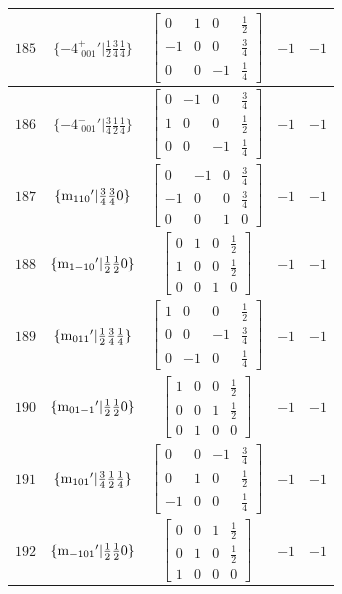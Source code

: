 \documentclass[fleqn,8pt]{jsarticle}
\begin{document}
\begin{longtable}{ccccc}
$ 185 $ & $ \{-4^{+}_{\,\,001}{}'|\frac{1}{2} \frac{3}{4} \frac{1}{4}\} $ & $ \begin{bmatrix} 0 & 1 & 0 & \frac{1}{2} \\ -1 & 0 & 0 & \frac{3}{4} \\ 0 & 0 & -1 & \frac{1}{4} \end{bmatrix} $ & $ -1 $ & $ -1 $ \\ \hline
$ 186 $ & $ \{-4^{-}_{\,\,001}{}'|\frac{3}{4} \frac{1}{2} \frac{1}{4}\} $ & $ \begin{bmatrix} 0 & -1 & 0 & \frac{3}{4} \\ 1 & 0 & 0 & \frac{1}{2} \\ 0 & 0 & -1 & \frac{1}{4} \end{bmatrix} $ & $ -1 $ & $ -1 $ \\ \hline
$ 187 $ & $ \{{\rm m}_{110}{}'|\frac{3}{4} \frac{3}{4} 0\} $ & $ \begin{bmatrix} 0 & -1 & 0 & \frac{3}{4} \\ -1 & 0 & 0 & \frac{3}{4} \\ 0 & 0 & 1 & 0 \end{bmatrix} $ & $ -1 $ & $ -1 $ \\ \hline
$ 188 $ & $ \{{\rm m}_{1-10}{}'|\frac{1}{2} \frac{1}{2} 0\} $ & $ \begin{bmatrix} 0 & 1 & 0 & \frac{1}{2} \\ 1 & 0 & 0 & \frac{1}{2} \\ 0 & 0 & 1 & 0 \end{bmatrix} $ & $ -1 $ & $ -1 $ \\ \hline
$ 189 $ & $ \{{\rm m}_{011}{}'|\frac{1}{2} \frac{3}{4} \frac{1}{4}\} $ & $ \begin{bmatrix} 1 & 0 & 0 & \frac{1}{2} \\ 0 & 0 & -1 & \frac{3}{4} \\ 0 & -1 & 0 & \frac{1}{4} \end{bmatrix} $ & $ -1 $ & $ -1 $ \\ \hline
$ 190 $ & $ \{{\rm m}_{01-1}{}'|\frac{1}{2} \frac{1}{2} 0\} $ & $ \begin{bmatrix} 1 & 0 & 0 & \frac{1}{2} \\ 0 & 0 & 1 & \frac{1}{2} \\ 0 & 1 & 0 & 0 \end{bmatrix} $ & $ -1 $ & $ -1 $ \\ \hline
$ 191 $ & $ \{{\rm m}_{101}{}'|\frac{3}{4} \frac{1}{2} \frac{1}{4}\} $ & $ \begin{bmatrix} 0 & 0 & -1 & \frac{3}{4} \\ 0 & 1 & 0 & \frac{1}{2} \\ -1 & 0 & 0 & \frac{1}{4} \end{bmatrix} $ & $ -1 $ & $ -1 $ \\ \hline
$ 192 $ & $ \{{\rm m}_{-101}{}'|\frac{1}{2} \frac{1}{2} 0\} $ & $ \begin{bmatrix} 0 & 0 & 1 & \frac{1}{2} \\ 0 & 1 & 0 & \frac{1}{2} \\ 1 & 0 & 0 & 0 \end{bmatrix} $ & $ -1 $ & $ -1 $ \\
\end{longtable}
\end{document}
